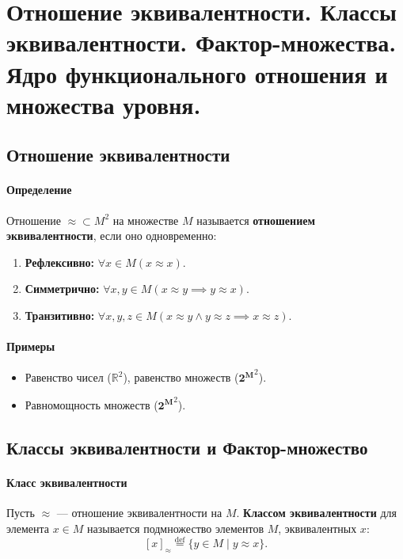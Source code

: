 \section{Отношение эквивалентности. Классы эквивалентности. Фактор-множества. Ядро функционального отношения и множества уровня.}


\subsection*{Отношение эквивалентности}

\paragraph{Определение}
Отношение $\approx \subset M^2$ на множестве $M$ называется \textbf{отношением эквивалентности}, если оно одновременно:
\begin{enumerate}
    \item \textbf{Рефлексивно:} $\forall x \in M (x \approx x)$.
    \item \textbf{Симметрично:} $\forall x, y \in M (x \approx y \implies y \approx x)$.
    \item \textbf{Транзитивно:} $\forall x, y, z \in M (x \approx y \land y \approx z \implies x \approx z)$.
\end{enumerate}

\paragraph{Примеры}
\begin{itemize}
    \item Равенство чисел ($\mathbb{R}^2$), равенство множеств ($\mathbf{2^M}^2$).
    \item Равномощность множеств ($\mathbf{2^M}^2$).
\end{itemize}

\subsection*{Классы эквивалентности и Фактор-множество}

\paragraph{Класс эквивалентности}
Пусть $\approx$ --- отношение эквивалентности на $M$. \textbf{Классом эквивалентности} для элемента $x \in M$ называется подмножество элементов $M$, эквивалентных $x$:
$$[x]_\approx \stackrel{\text{def}}{=} \{y \in M \mid y \approx x\}.$$

